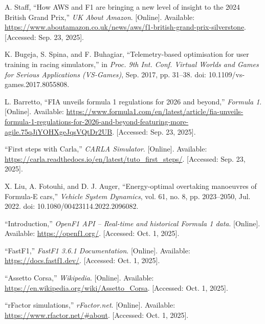 \documentclass[11pt]{article} %
\begin{document}
\begin{thebibliography}{9}

A. Staff, ``How AWS and F1 are bringing a new level of insight to the 2024 British Grand Prix,'' \emph{UK About Amazon}. [Online]. Available: \url{https://www.aboutamazon.co.uk/news/aws/f1-british-grand-prix-silverstone}. [Accessed: Sep. 23, 2025].

K. Bugeja, S. Spina, and F. Buhagiar, ``Telemetry-based optimisation for user training in racing simulators,'' in \emph{Proc. 9th Int. Conf. Virtual Worlds and Games for Serious Applications (VS-Games)}, Sep. 2017, pp. 31--38. doi: 10.1109/vs-games.2017.8055808.

L. Barretto, ``FIA unveils formula 1 regulations for 2026 and beyond,'' \emph{Formula 1\textregistered}. [Online]. Available: \url{https://www.formula1.com/en/latest/article/fia-unveils-formula-1-regulations-for-2026-and-beyond-featuring-more-agile.75qJiYOHXgeJqsVQtDr2UB}. [Accessed: Sep. 23, 2025].

``First steps with Carla,'' \emph{CARLA Simulator}. [Online]. Available: \url{https://carla.readthedocs.io/en/latest/tuto_first_steps/}. [Accessed: Sep. 23, 2025].

X. Liu, A. Fotouhi, and D. J. Auger, ``Energy-optimal overtaking manoeuvres of Formula-E cars,'' \emph{Vehicle System Dynamics}, vol. 61, no. 8, pp. 2023--2050, Jul. 2022. doi: 10.1080/00423114.2022.2096082.

``Introduction,'' \emph{OpenF1 API – Real-time and historical Formula 1 data}. [Online]. Available: \url{https://openf1.org/}. [Accessed: Oct. 1, 2025].

``FastF1,'' \emph{FastF1 3.6.1 Documentation}. [Online]. Available: \url{https://docs.fastf1.dev/}. [Accessed: Oct. 1, 2025].

``Assetto Corsa,'' \emph{Wikipedia}. [Online]. Available: \url{https://en.wikipedia.org/wiki/Assetto_Corsa}. [Accessed: Oct. 1, 2025].

``rFactor simulations,'' \emph{rFactor.net}. [Online]. Available: \url{https://www.rfactor.net/#about}. [Accessed: Oct. 1, 2025].

\end{thebibliography}
\end{document}
